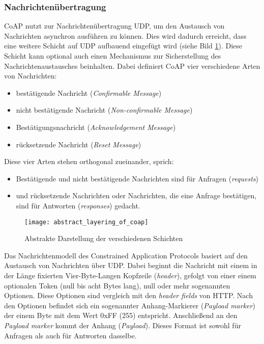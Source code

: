 \subsubsection{Nachrichtenübertragung}
\label{subsubsec:nachrichtenuebertragung}

CoAP nutzt zur Nachrichtenübertragung UDP, um den Austausch von Nachrichten asynchron ausführen zu können. Dies wird dadurch erreicht, dass eine weitere Schicht auf UDP aufbauend eingefügt wird (siehe Bild \ref{fig:abstrakte-darstellung-der-verschiedenen-schichten}). Diese Schicht kann optional auch einen Mechanismus zur Sicherstellung des Nachrichtenaustausches beinhalten. Dabei definiert CoAP vier verschiedene Arten von Nachrichten:
\begin{itemize}
    \item bestätigende Nachricht (\textit{Confirmable Message})
    \item nicht bestätigende Nachricht (\textit{Non-confirmable Message})
    \item Bestätigungsnachricht (\textit{Acknowledgement Message})
    \item rücksetzende Nachricht (\textit{Reset Message})
\end{itemize}

Diese vier Arten stehen orthogonal zueinander, sprich:
\begin{itemize}
    \item Bestätigende und nicht bestätigende Nachrichten sind für Anfragen (\textit{requests})
    \item und rücksetzende Nachrichten oder Nachrichten, die eine Anfrage bestätigen, sind für Antworten (\textit{responses}) gedacht.
\end{itemize}

\begin{figure}[h]
    \centering
    \texttt{[image: abstract\_layering\_of\_coap]}
    \caption{Abstrakte Darstellung der verschiedenen Schichten}
    \label{fig:abstrakte-darstellung-der-verschiedenen-schichten}
\end{figure}

Das Nachrichtenmodell des Constrained Application Protocols basiert auf den Austausch von Nachrichten über UDP. Dabei beginnt die Nachricht mit einem in der Länge fixierten Vier-Byte-Langen Kopfzeile (\textit{header}), gefolgt von einer einem optionalen Token (null bis acht Bytes lang), null oder mehr sogenannten Optionen. Diese Optionen sind vergleich mit den \textit{header fields} von HTTP. Nach den Optionen befindet sich ein sogenannter Anhang-Markierer (\textit{Payload marker}) der einem Byte mit dem Wert 0xFF (255) entspricht. Anschließend an den \textit{Payload marker} kommt der Anhang (\textit{Payload}). Dieses Format ist sowohl für Anfragen als auch für Antworten dasselbe.

